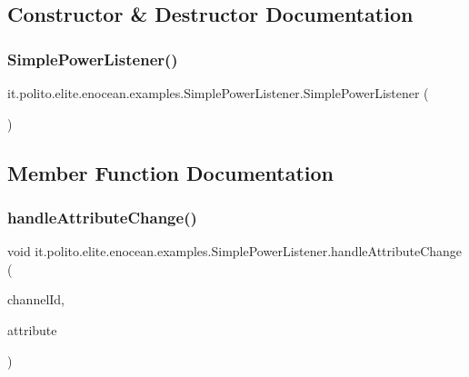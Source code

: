 \subsection{Constructor \& Destructor Documentation}
\hypertarget{classit_1_1polito_1_1elite_1_1enocean_1_1examples_1_1_simple_power_listener_ab0a780db653b3491a63811ecec252da0}{}\label{classit_1_1polito_1_1elite_1_1enocean_1_1examples_1_1_simple_power_listener_ab0a780db653b3491a63811ecec252da0} 
\subsubsection{\texorpdfstring{Simple\+Power\+Listener()}{SimplePowerListener()}}
{\footnotesize\ttfamily it.\+polito.\+elite.\+enocean.\+examples.\+Simple\+Power\+Listener.\+Simple\+Power\+Listener (\begin{DoxyParamCaption}{ }\end{DoxyParamCaption})}



\subsection{Member Function Documentation}
\hypertarget{classit_1_1polito_1_1elite_1_1enocean_1_1examples_1_1_simple_power_listener_ab479959b53e0206e832d1e5f31da8cc6}{}\label{classit_1_1polito_1_1elite_1_1enocean_1_1examples_1_1_simple_power_listener_ab479959b53e0206e832d1e5f31da8cc6} 
\subsubsection{\texorpdfstring{handle\+Attribute\+Change()}{handleAttributeChange()}}
{\footnotesize\ttfamily void it.\+polito.\+elite.\+enocean.\+examples.\+Simple\+Power\+Listener.\+handle\+Attribute\+Change (\begin{DoxyParamCaption}\item[{int}]{channel\+Id,  }\item[{\hyperlink{classit_1_1polito_1_1elite_1_1enocean_1_1enj_1_1eep_1_1_e_e_p_attribute}{E\+E\+P\+Attribute}$<$?$>$}]{attribute }\end{DoxyParamCaption})}

